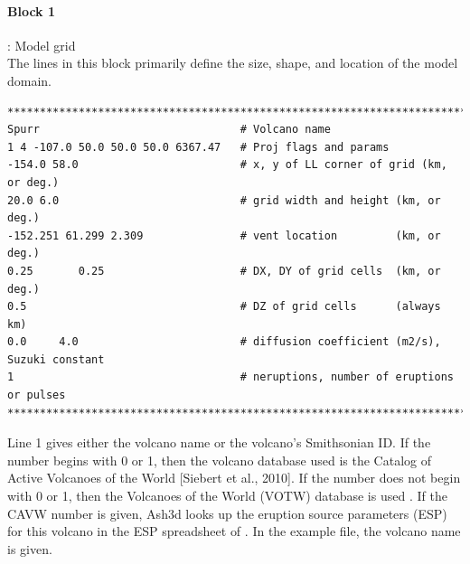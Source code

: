 \paragraph{Block 1}: Model grid\\
The lines in this block primarily define the size, shape,
and location of the model domain.
\small
\begin{verbatim}
*******************************************************************************
Spurr                               # Volcano name
1 4 -107.0 50.0 50.0 50.0 6367.47   # Proj flags and params
-154.0 58.0                         # x, y of LL corner of grid (km, or deg.)
20.0 6.0                            # grid width and height (km, or deg.)
-152.251 61.299 2.309               # vent location         (km, or deg.)
0.25       0.25                     # DX, DY of grid cells  (km, or deg.)
0.5                                 # DZ of grid cells      (always km)
0.0     4.0                         # diffusion coefficient (m2/s), Suzuki constant
1                                   # neruptions, number of eruptions or pulses
*******************************************************************************
\end{verbatim}
\normalsize

Line 1 gives either the volcano name or the volcano’s Smithsonian ID.
If the number begins with 0 or 1, then the volcano database used is
the Catalog of Active Volcanoes of the World [Siebert et al., 2010].
If the number does not begin with 0 or 1, then the Volcanoes of the
World (VOTW) database is used \cite{GVP2024}.
If the CAVW number is given, Ash3d looks up the eruption source
parameters (ESP) for this volcano in the ESP spreadsheet of
\cite{Mastin2009a}. In the example file, the volcano name
is given.

